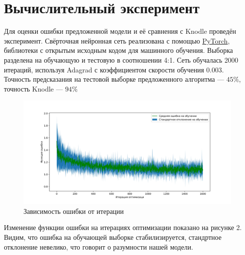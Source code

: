\documentclass[12pt,twoside]{article}
\begin{document}
\section{Вычислительный эксперимент}
	Для оценки ошибки предложенной модели и её сравнения с Knodle \cite{article1} проведён эксперимент. Свёрточная нейронная сеть реализована с помощью \href{https://pytorch.org/}{PyTorch}, библиотеки с открытым исходным кодом для машинного обучения. Выборка разделена на обучающую и тестовую в соотношении 4:1. Сеть обучалась 2000 итераций, используя Adagrad с коэффициентом скорости обучения 0.003. Точность предсказания на тестовой выборке предложенного алгоритма --- $45\%$, точность Knodle --- $94\%$
\begin{figure}[ht]
	\includegraphics[width=\linewidth]{pic1.jpg}
  \caption{Зависимость ошибки от итерации}
  \label{fig:pic1}
\end{figure}

	Изменение функции ошибки на итерациях оптимизации показано на рисунке 2. Видим, что ошибка на обучающей выборке стабилизируется, стандртное отклонение невелико, что говорит о разумности нашей модели.
\end{document}
